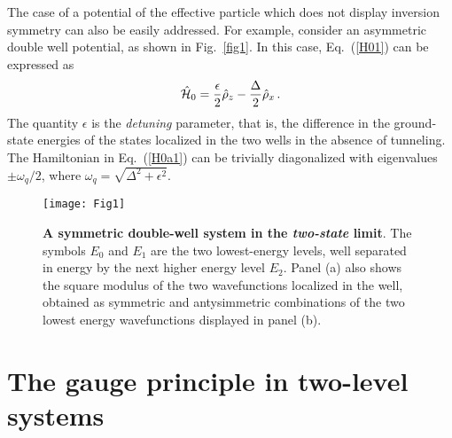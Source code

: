 \documentclass[aps,pra,reprint, superscriptaddress,amsmath,showpacs,longbibliography]{revtex4-2}
\newcommand{\figref}[1]{\mbox{Fig.~\ref{#1}}}
\renewcommand{\eqref}[1]{\mbox{Eq.~(\ref{#1})}}
\newcommand{\be}{\begin{equation}}
\newcommand{\ee}{\end{equation}}
\begin{document}
The case of a potential of the effective particle which does not display inversion symmetry can also be easily addressed. For example, consider an asymmetric double well potential, as shown in \figref{fig1}.  
In this case,  \eqref{H01} can be expressed as 
\be\label{H0a1}
\hat {\cal H}_0 = \frac{\epsilon}{2} \hat \rho_z - \frac{\Delta}{2} \hat \rho_x\, .
\ee
The quantity $\epsilon$ is the {\em detuning} parameter,
that is, the difference in the ground-state energies of the states localized in the two wells in the absence of tunneling. The Hamiltonian in \eqref{H0a1} can be trivially diagonalized with eigenvalues $\pm \omega_q/2$, where $\omega_q = \sqrt{\Delta^2 + \epsilon^2}$.




\begin{figure}[htpb]  
	\centering
	\texttt{[image: Fig1]}  
	\caption{{\bf A symmetric double-well system in the {\em two-state} limit}. {The symbols} $E_0$ and $E_1$ are the two lowest-energy levels, well separated in energy by the next higher energy level $E_2$. Panel (a) also shows the square modulus of the two wavefunctions localized in the well, obtained as symmetric and antysimmetric combinations of the two lowest energy wavefunctions displayed in panel (b).}

	\label{fig2}
\end{figure}


\section{The gauge principle in two-level systems}
\label{GaugeTLS}
\end{document}
